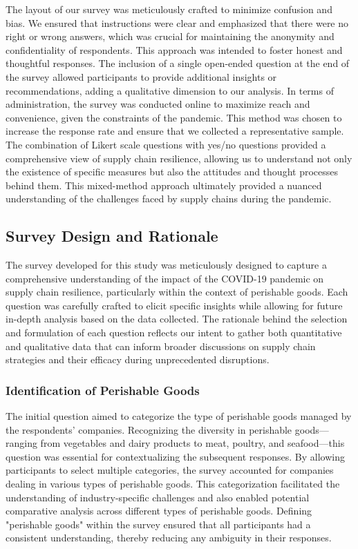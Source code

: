 The layout of our survey was meticulously crafted to minimize confusion and bias. We ensured that instructions were clear and emphasized that there were no right or wrong answers, which was crucial for maintaining the anonymity and confidentiality of respondents. This approach was intended to foster honest and thoughtful responses. The inclusion of a single open-ended question at the end of the survey allowed participants to provide additional insights or recommendations, adding a qualitative dimension to our analysis. In terms of administration, the survey was conducted online to maximize reach and convenience, given the constraints of the pandemic. This method was chosen to increase the response rate and ensure that we collected a representative sample. The combination of Likert scale questions with yes/no questions provided a comprehensive view of supply chain resilience, allowing us to understand not only the existence of specific measures but also the attitudes and thought processes behind them. This mixed-method approach ultimately provided a nuanced understanding of the challenges faced by supply chains during the pandemic.

\subsection{Survey Design and Rationale}

The survey developed for this study was meticulously designed to capture a comprehensive understanding of the impact of the COVID-19 pandemic on supply chain resilience, particularly within the context of perishable goods. Each question was carefully crafted to elicit specific insights while allowing for future in-depth analysis based on the data collected. The rationale behind the selection and formulation of each question reflects our intent to gather both quantitative and qualitative data that can inform broader discussions on supply chain strategies and their efficacy during unprecedented disruptions.

\subsubsection*{Identification of Perishable Goods}
The initial question aimed to categorize the type of perishable goods managed by the respondents' companies. Recognizing the diversity in perishable goods—ranging from vegetables and dairy products to meat, poultry, and seafood—this question was essential for contextualizing the subsequent responses. By allowing participants to select multiple categories, the survey accounted for companies dealing in various types of perishable goods. This categorization facilitated the understanding of industry-specific challenges and also enabled potential comparative analysis across different types of perishable goods. Defining "perishable goods" within the survey ensured that all participants had a consistent understanding, thereby reducing any ambiguity in their responses.

